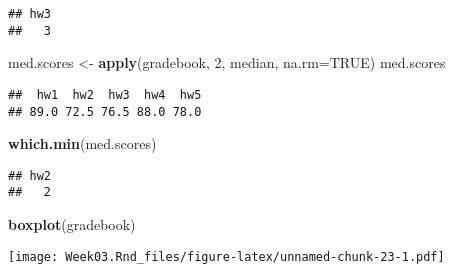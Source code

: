 \documentclass[
]{article}
\newenvironment{Shaded}{\begin{snugshade}}{\end{snugshade}}
\newcommand{\AttributeTok}[1]{\textcolor[rgb]{0.13,0.29,0.53}{#1}}
\newcommand{\ConstantTok}[1]{\textcolor[rgb]{0.56,0.35,0.01}{#1}}
\newcommand{\DecValTok}[1]{\textcolor[rgb]{0.00,0.00,0.81}{#1}}
\newcommand{\FunctionTok}[1]{\textcolor[rgb]{0.13,0.29,0.53}{\textbf{#1}}}
\newcommand{\NormalTok}[1]{#1}
\newcommand{\OtherTok}[1]{\textcolor[rgb]{0.56,0.35,0.01}{#1}}
\begin{document}
\begin{verbatim}
## hw3 
##   3
\end{verbatim}

\begin{Shaded}
\begin{Highlighting}[]
\NormalTok{med.scores }\OtherTok{\textless{}{-}} \FunctionTok{apply}\NormalTok{(gradebook, }\DecValTok{2}\NormalTok{, median, }\AttributeTok{na.rm=}\ConstantTok{TRUE}\NormalTok{)}
\NormalTok{med.scores}
\end{Highlighting}
\end{Shaded}

\begin{verbatim}
##  hw1  hw2  hw3  hw4  hw5 
## 89.0 72.5 76.5 88.0 78.0
\end{verbatim}

\begin{Shaded}
\begin{Highlighting}[]
\FunctionTok{which.min}\NormalTok{(med.scores)}
\end{Highlighting}
\end{Shaded}

\begin{verbatim}
## hw2 
##   2
\end{verbatim}

\begin{Shaded}
\begin{Highlighting}[]
\FunctionTok{boxplot}\NormalTok{(gradebook)}
\end{Highlighting}
\end{Shaded}

\texttt{[image: Week03.Rnd\_files/figure-latex/unnamed-chunk-23-1.pdf]}
\end{document}
